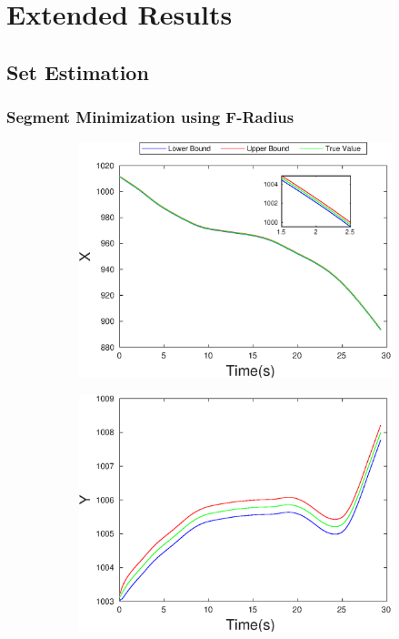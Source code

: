 \chapter{Extended Results} \label{ch:eresult}
\section{Set Estimation}\label{eresult:setest}
\FloatBarrier
\subsection{Segment Minimization using F-Radius}
\FloatBarrier
\begin{figure}[h]
\begin{subfigure}{.5\linewidth}
\centering
\includegraphics[width=\linewidth]{figures/Frad/s3cvSMX}
\end{subfigure}
\begin{subfigure}{.5\linewidth}
\centering
\includegraphics[width=\linewidth]{figures/Frad/s3cvSMY}

\end{subfigure}
\end{figure}
